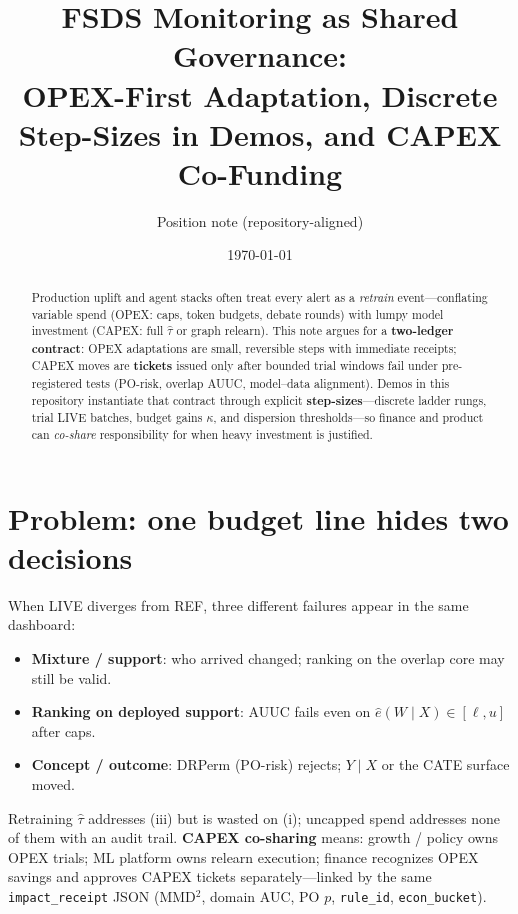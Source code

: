 \documentclass[11pt]{article}
\title{FSDS Monitoring as Shared Governance:\\
OPEX-First Adaptation, Discrete Step-Sizes in Demos, and CAPEX Co-Funding}
\author{Position note (repository-aligned)}
\date{\today}
\begin{document}
\maketitle

\begin{abstract}
Production uplift and agent stacks often treat every alert as a \emph{retrain} event---conflating variable spend (OPEX: caps, token budgets, debate rounds) with lumpy model investment (CAPEX: full $\hat\tau$ or graph relearn).
This note argues for a \textbf{two-ledger contract}: OPEX adaptations are small, reversible steps with immediate receipts; CAPEX moves are \textbf{tickets} issued only after bounded trial windows fail under pre-registered tests (PO-risk, overlap AUUC, model--data alignment).
Demos in this repository instantiate that contract through explicit \textbf{step-sizes}---discrete ladder rungs, trial LIVE batches, budget gains $\kappa$, and dispersion thresholds---so finance and product can \emph{co-share} responsibility for when heavy investment is justified.
\end{abstract}

\section{Problem: one budget line hides two decisions}
When LIVE diverges from REF, three different failures appear in the same dashboard:
\begin{itemize}[nosep]
  \item \textbf{Mixture / support}: who arrived changed; ranking on the overlap core may still be valid.
  \item \textbf{Ranking on deployed support}: AUUC fails even on $\hat e(W\mid X)\in[\ell,u]$ after caps.
  \item \textbf{Concept / outcome}: DRPerm (PO-risk) rejects; $Y\mid X$ or the CATE surface moved.
\end{itemize}
Retraining $\hat\tau$ addresses (iii) but is wasted on (i); uncapped spend addresses none of them with an audit trail.
\textbf{CAPEX co-sharing} means: growth / policy owns OPEX trials; ML platform owns relearn execution; finance recognizes OPEX savings and approves CAPEX tickets separately---linked by the same \texttt{impact\_receipt} JSON (MMD$^2$, domain AUC, PO $p$, \texttt{rule\_id}, \texttt{econ\_bucket}).
\end{document}
